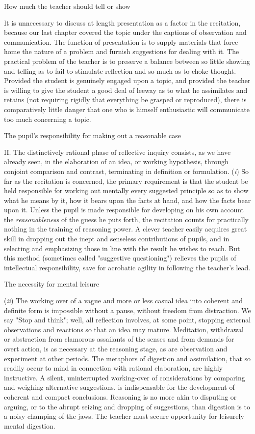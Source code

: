 \documentclass[letterpaper]{book}
\begin{document}
How much the teacher should tell or show

It is unnecessary to discuss at length presentation as a factor in the
recitation, because our last chapter covered the topic under the
captions of observation and communication. The function of presentation
is to supply materials that force home the nature of a problem and
furnish suggestions for dealing with it. The practical problem of the
teacher is to preserve a balance between so little showing and telling
as to fail to stimulate reflection and so much as to choke thought.
Provided the student is genuinely engaged upon a topic, and provided the
teacher is willing to give the student a good deal of leeway as to what
he assimilates and retains (not requiring rigidly that everything be
grasped or
reproduced),
there is comparatively little danger that one who is himself
enthusiastic will communicate too much concerning a topic.

The pupil's responsibility for making out a reasonable case

II. The distinctively rational phase of reflective inquiry consists, as
we have already seen, in the elaboration of an idea, or working
hypothesis, through conjoint comparison and contrast, terminating in
definition or formulation. (\emph{i}) So far as the recitation is
concerned, the primary requirement is that the student be held
responsible for working out mentally every suggested principle so as to
show what he means by it, how it bears upon the facts at hand, and how
the facts bear upon it. Unless the pupil is made responsible for
developing on his own account the \emph{reasonableness} of the guess he
puts forth, the recitation counts for practically nothing in the
training of reasoning power. A clever teacher easily acquires great
skill in dropping out the inept and senseless contributions of pupils,
and in selecting and emphasizing those in line with the result he wishes
to reach. But this method (sometimes called "suggestive questioning")
relieves the pupils of intellectual responsibility, save for acrobatic
agility in following the teacher's lead.

The necessity for mental leisure

(\emph{ii}) The working over of a vague and more or less casual idea
into coherent and definite form is impossible without a pause, without
freedom from distraction. We say "Stop and think"; well, all reflection
involves, at some point, stopping external observations and reactions so
that an idea may mature. Meditation, withdrawal or abstraction from
clamorous assailants of the senses and from demands for overt action, is
as necessary at the reasoning stage, as are observation and experiment
at other periods. The metaphors of digestion
and
assimilation, that so readily occur to mind in connection with rational
elaboration, are highly instructive. A silent, uninterrupted
working-over of considerations by comparing and weighing alternative
suggestions, is indispensable for the development of coherent and
compact conclusions. Reasoning is no more akin to disputing or arguing,
or to the abrupt seizing and dropping of suggestions, than digestion is
to a noisy champing of the jaws. The teacher must secure opportunity for
leisurely mental digestion.
\end{document}

